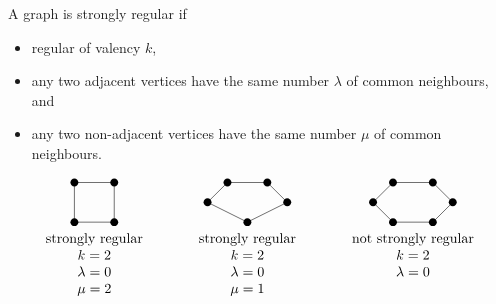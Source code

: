 A graph is strongly regular if
\begin{itemize}
\item regular of valency $ k $,
\item any two adjacent vertices have the same number $ \lambda $ of common neighbours, and
\item any two non-adjacent vertices have the same number $ \mu $ of common neighbours.
\end{itemize}

\begin{example*}
$$
\begin{array}{ccccc}
\begin{tikzpicture}
\fill (0, 0) circle (0.1);
\fill (1, 0) circle (0.1);
\fill (0, -1) circle (0.1);
\fill (1, -1) circle (0.1);
\draw (0, 0) to (1, 0);
\draw (0, 0) to (0, -1);
\draw (1, 0) to (1, -1);
\draw (0, -1) to (1, -1);
\end{tikzpicture}
& \qquad &
\begin{tikzpicture}
\fill (0, 0) circle (0.1);
\fill (1, 0) circle (0.1);
\fill (-0.5, -0.5) circle (0.1);
\fill (1.5, -0.5) circle (0.1);
\fill (0.5, -1) circle (0.1);
\draw (0, 0) to (1, 0);
\draw (0, 0) to (-0.5, -0.5);
\draw (1, 0) to (1.5, -0.5);
\draw (-0.5, -0.5) to (0.5, -1);
\draw (1.5, -0.5) to (0.5, -1);
\end{tikzpicture}
& \qquad &
\begin{tikzpicture}
\fill (0, 0) circle (0.1);
\fill (1, 0) circle (0.1);
\fill (-0.5, -0.5) circle (0.1);
\fill (1.5, -0.5) circle (0.1);
\fill (0, -1) circle (0.1);
\fill (1, -1) circle (0.1);
\draw (0, 0) to (1, 0);
\draw (0, 0) to (-0.5, -0.5);
\draw (1, 0) to (1.5, -0.5);
\draw (-0.5, -0.5) to (0, -1);
\draw (1.5, -0.5) to (1, -1);
\draw (0, -1) to (1, -1);
\end{tikzpicture}
\\
\text{strongly regular} & & \text{strongly regular} & & \text{not strongly regular} \\
k = 2 & & k = 2 & & k = 2 \\
\lambda = 0 & & \lambda = 0 & & \lambda = 0 \\
\mu = 2 & & \mu = 1 & &
\end{array}
$$
\end{example*}

